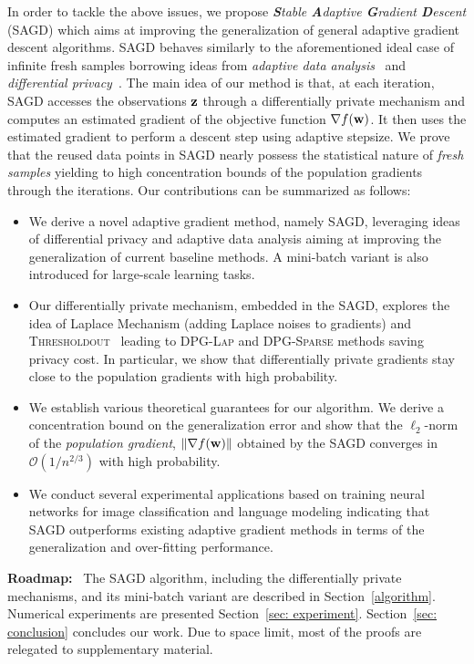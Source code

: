 \documentclass[11pt]{article}
\begin{document}
In order to tackle the above issues, we propose \textit{\textbf{S}table \textbf{A}daptive \textbf{G}radient \textbf{D}escent} (\textsc{SAGD}) which aims at improving the generalization of general adaptive gradient descent algorithms.
\textsc{SAGD} behaves similarly to the aforementioned ideal case of infinite fresh samples borrowing ideas from \emph{adaptive data analysis}~\citep{Proc:Dwork_NIPS15} and \emph{differential privacy}~\citep{Article:Dwork_2014}. 
The main idea of our method is that, at each iteration, \textsc{SAGD} accesses the observations $\mathbf{z}$ through a differentially private mechanism and computes an estimated gradient 
of the objective function $\nabla f(\mathbf{w})$. 
It then uses the estimated gradient to perform a descent step using adaptive stepsize. 
We prove that the reused data points in \textsc{SAGD} nearly possess the statistical nature of \emph{fresh samples} yielding to high concentration bounds of the population gradients through the iterations. Our  contributions  can be summarized as follows:
\begin{itemize}
\item We derive a novel adaptive gradient method, namely \textsc{SAGD}, leveraging ideas of differential privacy and adaptive data analysis aiming at improving the generalization of current baseline methods. A mini-batch variant is also introduced for large-scale learning tasks.
\item Our differentially private mechanism, embedded in the \textsc{SAGD}, explores the idea of Laplace Mechanism (adding Laplace noises to gradients) and \textsc{Thresholdout}~\citep{Article:Dwork_2014} leading to \textsc{DPG-Lap} and \textsc{DPG-Sparse} methods saving privacy cost. 
In particular, we show that differentially private gradients stay close to the population gradients with high probability. 
\item We establish various theoretical guarantees for our algorithm. We derive a concentration bound on the generalization error and show that the $\ell_2$-norm of the \emph{population gradient}, \ie $\|\nabla f(\mathbf{w})\|$ obtained by the \textsc{SAGD} converges in $\mathcal{O}(1/n^{2/3})$ with high probability. 
\item We conduct several experimental applications based on training neural networks for image classification and language modeling indicating that \textsc{SAGD} outperforms existing adaptive gradient methods in terms of the generalization and over-fitting performance.
\end{itemize}
\textbf{Roadmap:} \ 
The \textsc{SAGD} algorithm, including the differentially private mechanisms, and its mini-batch variant are described in Section~\ref{algorithm}. 
Numerical experiments are presented Section~\ref{sec: experiment}. 
Section~\ref{sec: conclusion} concludes our work. 
Due to space limit, most of the proofs are relegated to supplementary material.
\end{document}
